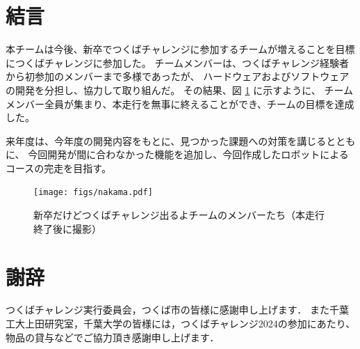 \documentclass[twocolumn,9pt]{jsproceedings}
\begin{document}
\section{結言}
本チームは今後、新卒でつくばチャレンジに参加するチームが増えることを目標につくばチャレンジに参加した。
チームメンバーは、つくばチャレンジ経験者から初参加のメンバーまで多様であったが、
ハードウェアおよびソフトウェアの開発を分担し、協力して取り組んだ。
その結果、図 \ref{fig:nakama} に示すように、
チームメンバー全員が集まり、本走行を無事に終えることができ、チームの目標を達成した。

来年度は、今年度の開発内容をもとに、見つかった課題への対策を講じるとともに、
今回開発が間に合わなかった機能を追加し、今回作成したロボットによるコースの完走を目指す。

\begin{figure}[h]
  \begin{center}
    \texttt{[image: figs/nakama.pdf]}
    \caption{新卒だけどつくばチャレンジ出るよチームのメンバーたち（本走行終了後に撮影）}
    \label{fig:nakama}
  \end{center}
\end{figure}

\section*{謝辞}
つくばチャレンジ実行委員会，つくば市の皆様に感謝申し上げます．
また千葉工大上田研究室，千葉大学の皆様には，つくばチャレンジ2024の参加にあたり、物品の貸与などでご協力頂き感謝申し上げます．
\end{document}
